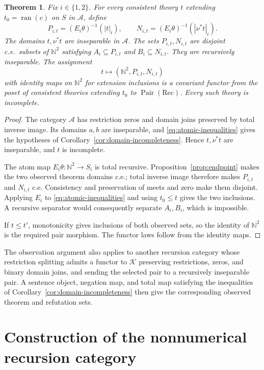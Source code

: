 \documentclass[11pt]{article}
\newtheorem{theorem}{Theorem}[section]
\newcommand{\N}{\mathbb N}
\newcommand{\ran}{\operatorname{ran}}
\begin{document}
\begin{theorem}\label{thm:cosheaf-observation}
Fix $i\in\{1,2\}$. For every consistent theory $t$ extending
$t_0=\ran(c)$ on $S$ in $\mathcal A$, define
\[
 P_{i,t}=(E_i\theta)^{-1}(|t|_i),\qquad
 N_{i,t}=(E_i\theta)^{-1}(|\nu^*t|_i).
\]
The domains $t,\nu^*t$ are inseparable in $\mathcal A$.
The sets $P_{i,t},N_{i,t}$ are disjoint c.e.\ subsets of $\N^2$ satisfying
$A_i\subseteq P_{i,t}$ and $B_i\subseteq N_{i,t}$.
They are recursively inseparable. The assignment
\[
 t\longmapsto(\N^2,P_{i,t},N_{i,t})
\]
with identity maps on $\N^2$ for extension inclusions is a
covariant functor from the poset of consistent theories extending
$t_0$ to $\operatorname{Pair}(\mathrm{Rec})$.
Every such theory is incomplete.
\end{theorem}
\begin{proof}
The category $\mathcal A$ has restriction zeros and domain joins
preserved by total inverse image. Its domains $a,b$ are inseparable,
and \eqref{eq:atomic-inequalities} gives the hypotheses of
Corollary~\ref{cor:domain-incompleteness}. Hence $t,\nu^*t$ are
inseparable, and $t$ is incomplete.

The atom map $E_i\theta:\N^2\to S_i$ is total recursive.
Proposition~\ref{prop:endpoint} makes the two observed theorem
domains c.e.; total inverse image therefore makes $P_{i,t}$
and $N_{i,t}$ c.e. Consistency and preservation of meets and
zero make them disjoint. Applying $E_i$ to
\eqref{eq:atomic-inequalities} and using $t_0\le t$ gives
the two inclusions. A recursive separator would consequently
separate $A_i,B_i$, which is impossible.

If $t\le t'$, monotonicity gives inclusions of both observed
sets, so the identity of $\N^2$ is the required pair morphism.
The functor laws follow from the identity maps.
\end{proof}

The observation argument also applies to another recursion category
whose restriction splitting admits a functor to $\mathcal K$
preserving restrictions, zeros, and binary domain joins, and sending
the selected pair to a recursively inseparable pair. A sentence object,
negation map, and total map satisfying the inequalities of
Corollary~\ref{cor:domain-incompleteness} then give the corresponding
observed theorem and refutation sets.

\appendix

\section{Construction of the nonnumerical recursion category}\label{app:fork-structure}
\end{document}
